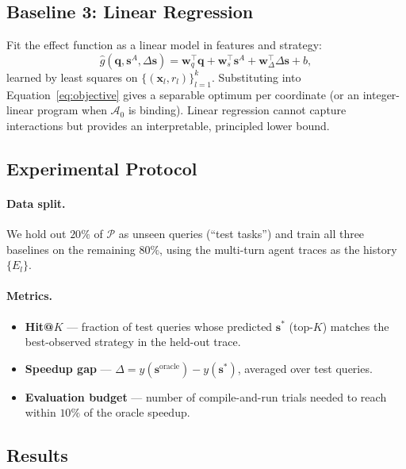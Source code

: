 \documentclass{article}
\begin{document}
\subsection{Baseline 3: Linear Regression}
\label{sec:bl3}
Fit the effect function as a linear model in features and strategy:
\begin{equation}
\hat{g}(\mathbf{q}, \mathbf{s}^A, \Delta\mathbf{s})
  = \mathbf{w}_q^{\top}\mathbf{q}
  + \mathbf{w}_s^{\top}\mathbf{s}^A
  + \mathbf{w}_\Delta^{\top}\Delta\mathbf{s} + b,
\label{eq:linreg}
\end{equation}
learned by least squares on $\{(\mathbf{x}_l, r_l)\}_{l=1}^{k}$.
Substituting into Equation~\eqref{eq:objective} gives a separable
optimum per coordinate (or an integer-linear program when
$\mathcal{A}_0$ is binding). Linear regression cannot capture
interactions but provides an interpretable, principled lower bound.

\subsection{Experimental Protocol}

\paragraph{Data split.} We hold out $20\%$ of $\mathcal{P}$ as
unseen queries (``test tasks'') and train all three baselines on the
remaining $80\%$, using the multi-turn agent traces as the history
$\{E_l\}$.

\paragraph{Metrics.}
\begin{itemize}
  \item \textbf{Hit@$K$} --- fraction of test queries whose predicted
  $\mathbf{s}^*$ (top-$K$) matches the best-observed strategy in the
  held-out trace.
  \item \textbf{Speedup gap} --- $\Delta = y(\mathbf{s}^{\mathrm{oracle}})
  - y(\mathbf{s}^*)$, averaged over test queries.
  \item \textbf{Evaluation budget} --- number of compile-and-run trials
  needed to reach within $10\%$ of the oracle speedup.
\end{itemize}

\subsection{Results}
\label{sec:strategy-results}
\end{document}
